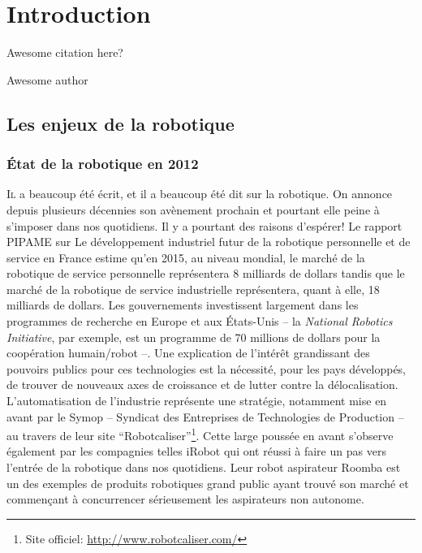 \chapter{Introduction}\label{chap:chap0}

\epigraph{Awesome citation here?}{Awesome author}
\clearpage

\section{Les enjeux de la robotique}

\subsection{État de la robotique en 2012}

\lettrine[lines=2, lraise=0.1, nindent=0em, slope=-.5em]%
{I}{l} a beaucoup été écrit, et il a beaucoup été dit sur la robotique. On
annonce depuis plusieurs décennies son avènement prochain et pourtant
elle peine à s'imposer dans nos quotidiens. Il y a pourtant des
raisons d'espérer! Le rapport PIPAME sur Le développement industriel
futur de la robotique personnelle et de service en France
\citep{12erdyn} estime qu'en 2015, au niveau mondial, le marché de la
robotique de service personnelle représentera 8 milliards de dollars
tandis que le marché de la robotique de service industrielle
représentera, quant à elle, 18 milliards de dollars. Les gouvernements
investissent largement dans les programmes de recherche en Europe et
aux États-Unis -- la \emph{National Robotics Initiative}, par exemple,
est un programme de 70 millions de dollars pour la coopération
humain/robot --. Une explication de l'intérêt grandissant des pouvoirs
publics pour ces technologies est la nécessité, pour les pays
développés, de trouver de nouveaux axes de croissance et de lutter
contre la délocalisation. L'automatisation de l'industrie représente
une stratégie, notamment mise en avant par le Symop -- Syndicat des
Entreprises de Technologies de Production -- au travers de leur site
``Robotcaliser''\footnote{Site officiel:
  \url{http://www.robotcaliser.com/}}. Cette large poussée en avant
s'observe également par les compagnies telles iRobot qui ont réussi à
faire un pas vers l'entrée de la robotique dans nos quotidiens. Leur
robot aspirateur Roomba est un des exemples de produits robotiques
grand public ayant trouvé son marché et commençant à concurrencer
sérieusement les aspirateurs non autonome.


